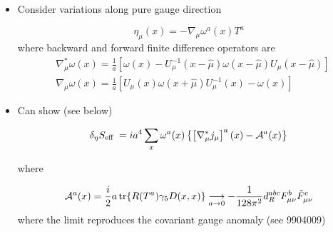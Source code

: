 \begin{itemize}
when the second tern comes from the implicit dependence of the measure \(D \psi_{\text {left }}\) on \(U\) and is of the form (by linearity in the variation)

\begin{equation}
\mathcal{L}_{\eta}=a^{4} \sum_{x} \eta_{\mu}^{a}(x) j_{\mu}^{a}(x ; U)
\end{equation}

where \(j_\mu^a(x;U)\) is an unknown current depending on the gauge field

  \item Consider variations along pure gauge direction

\begin{equation}
\eta_{\mu}(x)=-\nabla_{\mu} \omega^{a}(x) T^{a}
\end{equation}
where backward and forward finite difference operators are 
\begin{equation}
    \begin{aligned}
& \nabla_{\mu}^{\ast} \omega(x)=\frac{1}{a}\left[\omega(x)-U_{\mu}^{-1}(x-\hat{\mu}) \omega(x-\hat{\mu}) U_{\mu}(x-\hat{\mu})\right] \\
& \nabla_\mu \omega(x)=\frac{1}{a}\left[U_{\mu}(x) \omega(x+\hat{\mu}) U_{\mu}^{-1}(x)-\omega(x)\right] 
\end{aligned}
\end{equation}


\item Can show (see below)

\begin{equation}
    \delta_{\eta} S_{\text {eff }}=i a^{4} \sum_{x} \omega^{a}(x)\left\{\left[\nabla_{\mu}^{\ast} j_{\mu}\right]^{a}(x)-{\cal A}^{a}(x)\right\}
\end{equation}

where

\begin{equation}
    {\cal A}^{a}(x)=\frac{i}{2} a \operatorname{tr}\{R(T^a) \gamma_5 D(x, x)\} \underset{a \rightarrow 0}{\longrightarrow}-\frac{1}{128 \pi^{2}} d_{R}^{a b c} F_{\mu \nu}^{b} \tilde{F}_{\mu \nu}^{c}
\end{equation}
where the limit reproduces the covariant gauge anomaly (see 9904009)


\end{itemize}
